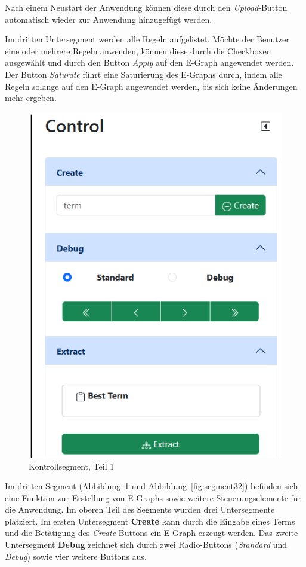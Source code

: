 Nach einem Neustart der Anwendung können diese durch den \textit{Upload}-Button automatisch wieder zur Anwendung hinzugefügt werden. 

Im dritten Untersegment werden alle Regeln aufgelistet. Möchte der Benutzer eine oder mehrere Regeln anwenden, können diese durch die Checkboxen ausgewählt und durch den 
Button \textit{Apply} auf den E-Graph angewendet werden. Der Button \textit{Saturate} führt eine Saturierung des E-Graphs durch, indem alle Regeln solange auf den E-Graph angewendet werden, bis sich keine Änderungen mehr ergeben.

\begin{figure}
    \vspace{-10mm}
    \begin{center}
      \includegraphics[scale=0.6]{../fig/control1.png}
    \end{center}
    \caption{Kontrollsegment, Teil 1}
    \label{fig:segment31}
\end{figure}

Im dritten Segment (Abbildung~\ref{fig:segment31} und Abbildung~\ref{fig:segment32}) befinden sich eine Funktion zur Erstellung von E-Graphs sowie weitere Steuerungselemente für die Anwendung.
Im oberen Teil des Segments wurden drei Untersegmente platziert. Im ersten Untersegment \textbf{Create} kann durch die Eingabe eines Terms und die Betätigung des \textit{Create}-Buttons
ein E-Graph erzeugt werden. Das zweite Untersegment \textbf{Debug} zeichnet sich durch zwei Radio-Buttons (\textit{Standard} und \textit{Debug}) sowie vier weitere Buttons aus. 

